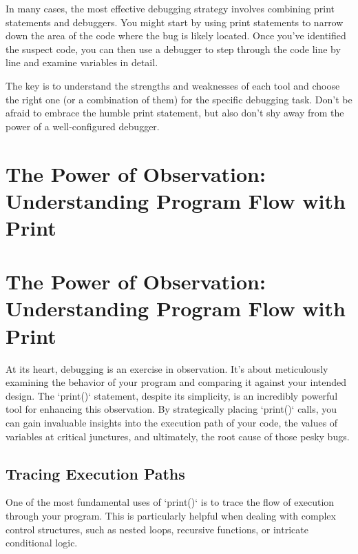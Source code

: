 \documentclass{article}
\begin{document}
In many cases, the most effective debugging strategy involves combining print statements and debuggers. You might start by using print statements to narrow down the area of the code where the bug is likely located. Once you've identified the suspect code, you can then use a debugger to step through the code line by line and examine variables in detail.

The key is to understand the strengths and weaknesses of each tool and choose the right one (or a combination of them) for the specific debugging task. Don't be afraid to embrace the humble print statement, but also don't shy away from the power of a well-configured debugger.

\newpage

\section*{The Power of Observation: Understanding Program Flow with Print} %
\label{chapter-2-4-The_Power_of_Observation__Understanding}

\section*{The Power of Observation: Understanding Program Flow with Print}

At its heart, debugging is an exercise in observation. It's about meticulously examining the behavior of your program and comparing it against your intended design. The `print()` statement, despite its simplicity, is an incredibly powerful tool for enhancing this observation. By strategically placing `print()` calls, you can gain invaluable insights into the execution path of your code, the values of variables at critical junctures, and ultimately, the root cause of those pesky bugs.

\subsection*{Tracing Execution Paths}

One of the most fundamental uses of `print()` is to trace the flow of execution through your program. This is particularly helpful when dealing with complex control structures, such as nested loops, recursive functions, or intricate conditional logic.
\end{document}
